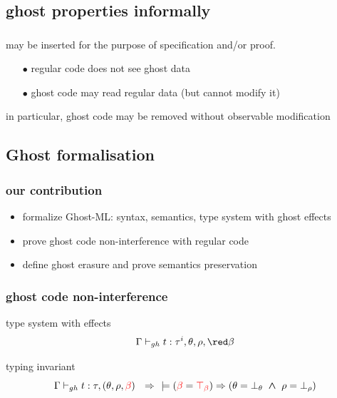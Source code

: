 \documentclass[xcolor=dvipsnames]{beamer}
\newcommand{\bwedge}{\boldsymbol{~\wedge~}}
\newcommand{\gb}{\beta}
\newcommand{\gbt}{\top_\beta}
\newcommand{\gbr}{\textcolor{red}{\gb}}
\newcommand{\gbtr}{\textcolor{red}{\gbt}}
\newcommand{\bth}{\bot_\theta}
\newcommand{\brh}{\bot_\rho}
\begin{document}
\subsection*{ghost properties informally}

\begin{frame}
\frametitle{}
	may be inserted for the purpose of specification and/or proof. \\[1em]
	\pause	
	\begin{itemize}
	\item[\red $\bullet$] regular code does not see ghost data
	\item[\red $\bullet$] ghost code may read regular data (but cannot modify it)\\[1em]
	\end{itemize}
in particular, ghost code may be removed without observable modification
\end{frame}




\subsection*{Ghost formalisation}


\begin{frame}
\frametitle{our contribution}
\begin{itemize}
\item formalize Ghost-ML: syntax, semantics, type system with ghost effects \pause
\item prove ghost code non-interference with regular code \pause
\item define ghost erasure and prove semantics preservation  
\end{itemize}
\end{frame}

\begin{frame}
\frametitle{ghost code non-interference}
type system with effects 
$$\Gamma \vdash_{gh} t: \tau^{i}, \theta, \rho, {\red \beta} $$

\bigskip\pause
typing invariant 
$$\Gamma \vdash_{gh} t : \tau, (\theta, \rho, \gbr) 
 ~~ \Rightarrow ~~
\models (\gbr = \gbtr) \Rightarrow (\theta = \bth \bwedge \rho = \brh) $$
\end{frame}
\end{document}

